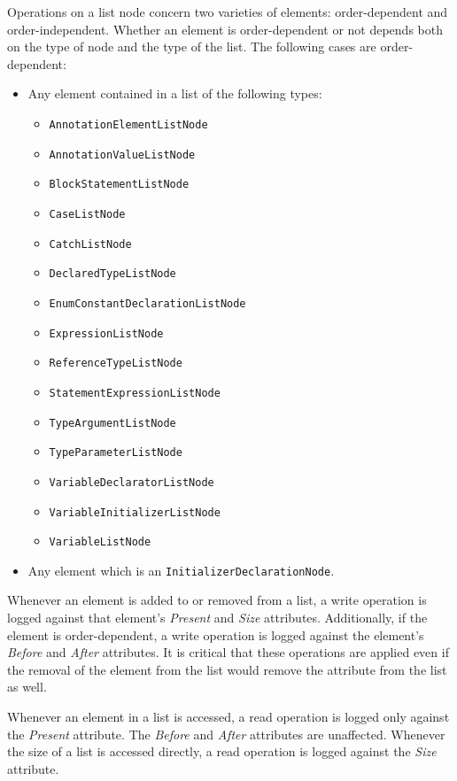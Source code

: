 \documentclass[a4paper,10pt]{report}
\begin{document}
Operations on a list node concern two varieties of elements: order-dependent and order-independent.  Whether an element is order-dependent or not depends both on the type of node and the type of the list.  The following cases are order-dependent:

\begin{itemize}
    \item Any element contained in a list of the following types:
    \begin{itemize}
        \item \verb`AnnotationElementListNode`
        \item \verb`AnnotationValueListNode`
        \item \verb`BlockStatementListNode`
        \item \verb`CaseListNode`
        \item \verb`CatchListNode`
        \item \verb`DeclaredTypeListNode`
        \item \verb`EnumConstantDeclarationListNode`
        \item \verb`ExpressionListNode`
        \item \verb`ReferenceTypeListNode`
        \item \verb`StatementExpressionListNode`
        \item \verb`TypeArgumentListNode`
        \item \verb`TypeParameterListNode`
        \item \verb`VariableDeclaratorListNode`
        \item \verb`VariableInitializerListNode`
        \item \verb`VariableListNode`
    \end{itemize}
    \item Any element which is an \verb`InitializerDeclarationNode`.
\end{itemize}

Whenever an element is added to or removed from a list, a write operation is logged against that element's \textit{Present} and \textit{Size} attributes.  Additionally, if the element is order-dependent, a write operation is logged against the element's \textit{Before} and \textit{After} attributes.  It is critical that these operations are applied even if the removal of the element from the list would remove the attribute from the list as well.

Whenever an element in a list is accessed, a read operation is logged only against the \textit{Present} attribute.  The \textit{Before} and \textit{After} attributes are unaffected.  Whenever the size of a list is accessed directly, a read operation is logged against the \textit{Size} attribute.
\end{document}
